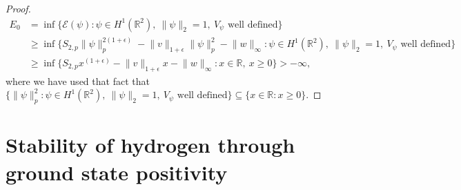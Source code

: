 \documentclass[a4paper,11pt]{article}
\newcommand{\R}{\mathbb{R}}
\numberwithin{equation}{section}
\begin{document}
\begin{proof}
\begin{equation}
\begin{aligned}
	E_0&=\inf\{\mathcal{E}(\psi):\psi\in H^1(\R^2),\ \lVert\psi \rVert_2=1,\ V_\psi\text{ well defined} \}\\&\geq \inf\{S_{2,p}\lVert \psi \rVert_p^{2(1+\epsilon)}-\lVert v\rVert_{1+\epsilon}\lVert \psi\rVert_p^2-\lVert w\rVert_\infty:\psi\in H^1(\R^2),\ \lVert\psi \rVert_2=1,\ V_\psi\text{ well defined} \}\\
	&\geq\inf\{S_{2,p} x^{(1+\epsilon)}-\lVert v\rVert_{1+\epsilon}x-\lVert w\rVert_\infty : x\in\R,\  x\geq0\}>-\infty,
	\end{aligned}
	\end{equation}
	where we have used that fact that\\ $ \{\lVert \psi \rVert_p^2 : \psi\in H^1(\R^2),\ \lVert\psi \rVert_2=1,\ V_\psi\text{ well defined}\}\subseteq \{x\in\R :  x\geq0\} $.
\end{proof}
\section{Stability of hydrogen through ground state positivity}
\end{document}
